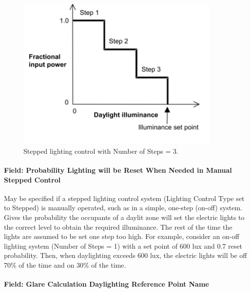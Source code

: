 \begin{figure}[hbtp] %
\centering
\includegraphics[width=0.9\textwidth, height=0.9\textheight, keepaspectratio=true]{media/image097.png}
\caption{Stepped lighting control with Number of Steps = 3. \protect \label{fig:stepped-lighting-control-with-number-of-steps}}
\end{figure}

\paragraph{Field: Probability Lighting will be Reset When Needed in Manual Stepped Control}\label{field-probability-lighting-will-be-reset-when-needed-in-manual-stepped-control}

May be specified if a stepped lighting control system (Lighting Control Type set to Stepped) is manually operated, such as in a simple, one-step (on-off) system. Gives the probability the occupants of a daylit zone will set the electric lights to the correct level to obtain the required illuminance. The rest of the time the lights are assumed to be set one step too high. For example, consider an on-off lighting system (Number of Steps = 1) with a set point of 600 lux and 0.7 reset probability. Then, when daylighting exceeds 600 lux, the electric lights will be off 70\% of the time and on 30\% of the time.

\paragraph{Field: Glare Calculation Daylighting Reference Point Name}\label{field-glare-calculation-daylighting-reference-point-name}

